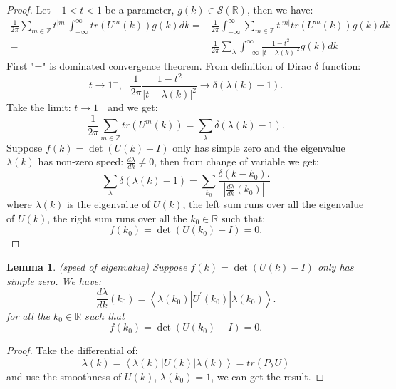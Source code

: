 \documentclass[draft]{article}
\newtheorem{lem}[thm]{Lemma}
\theoremstyle{definition}
\theoremstyle{remark}
\newcommand{\R}{\mathbb{R}}
\newcommand{\Z}{\mathbb{Z}}
\begin{document}
\begin{proof}
	Let $-1<t<1$ be a parameter, $g\left(k\right)\in \mathcal{S}\left(\R\right)$, then we have:
	\begin{align*}
	 \frac{1}{2\pi}\sum_{m\in \Z}t^{\left|m\right| }\int_{-\infty}^{\infty}tr\left(U^m\left(k\right)\right)g\left (k\right )dk=& 	\frac{1}{2\pi}\int_{-\infty}^{\infty}\sum_{m\in \Z}t^{\left|m\right| }tr\left(U^m\left(k\right)\right)g\left (k\right )dk \\
	 =&\frac{1}{2\pi}\sum_{\lambda}\int_{-\infty}^{\infty}\frac{1-t^2}{\left | t-\lambda\left (k\right )  \right |^2 } g\left (k\right )dk
	\end{align*}
	First "=" is dominated convergence theorem. From definition of Dirac $\delta$ function:
	$$
	t\to 1^{-},\ \ \ \frac{1}{2\pi}\frac{1-t^2}{\left | t-\lambda\left (k\right )  \right |^2} \to \delta\left(\lambda\left(k\right) -1\right).
	$$
	Take the limit: $t\to 1^{-}$ and we get:
	$$
	\frac{1}{2\pi}\sum_{m\in \Z}tr\left( U^m\left(k\right)\right)  =\sum_{\lambda}\delta\left(\lambda\left(k\right) -1\right).
	$$
	Suppose $f\left(k\right)=\det\left(U\left(k\right)-I\right)$ only has simple zero and the eigenvalue $\lambda\left(k\right)$ has non-zero speed: $\frac{d\lambda}{dk}\neq 0$, then from change of variable we get:
	$$
	\sum_{\lambda}\delta\left(\lambda\left(k\right) -1\right)=\sum_{k_0}\frac{\delta\left(k-k_0\right).}{\left|\frac{d\lambda}{dk}(k_0)\right| }
	$$
	where $\lambda\left(k\right)$ is the eigenvalue of $U\left(k\right)$, the left sum runs over all the eigenvalue of $U\left(k\right)$, the right sum runs over all the $k_0\in \R$ such that:
    $$f\left(k_0\right)=\det\left(U\left(k_0\right)-I\right)=0.$$
\end{proof}
 
\begin{lem}(speed of eigenvalue)
	Suppose $f\left(k\right)=\det\left(U\left(k\right)-I\right)$ only has simple zero.
	We have: $$\frac{d\lambda}{dk}\left(k_0\right)=\left \langle \lambda\left (k_0\right )  |U^{'}\left (k_0\right ) |\lambda\left (k_0\right )   \right \rangle.$$ for all the $k_0\in \R$ such that $$f\left(k_0\right)=\det\left(U\left(k_0\right)-I\right)=0.$$ 
\end{lem}
\begin{proof}
Take the differential of: 
$$
\lambda(k)=\left\langle\lambda(k)| U(k)|\lambda(k)\right\rangle=tr\left(P_{\lambda}U\right)   
$$
and use the smoothness of $U\left( k\right) $, $\lambda\left(k_0\right) =1$, we can get the result.
\end{proof}
\end{document}
